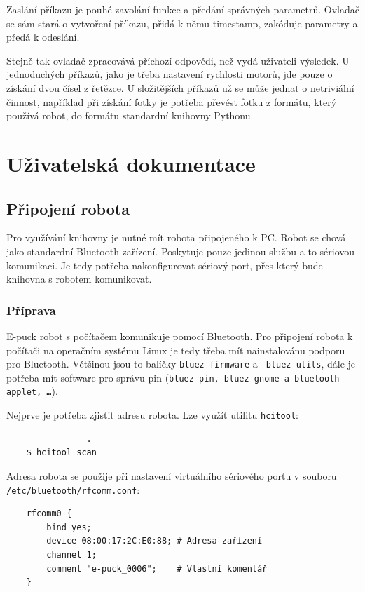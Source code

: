 \documentclass[12pt,notitlepage]{report}
\begin{document}
    Zaslání příkazu je pouhé zavolání funkce a předání správných parametrů.
    Ovladač se sám stará o vytvoření příkazu, přidá k němu timestamp, zakóduje
    parametry a předá k odeslání.

    Stejně tak ovladač zpracovává příchozí odpovědi, než vydá uživateli
    výsledek. U jednoduchých příkazů, jako je třeba nastavení rychlosti motorů,
    jde pouze o získání dvou čísel z řetězce. U složitějších příkazů už se může
    jednat o netriviální činnost, například při získání fotky je potřeba
    převést fotku z formátu, který používá robot, do formátu standardní
    knihovny Pythonu.

\chapter{Uživatelská dokumentace} %

    \section{Připojení robota}
    \label{pripojeni_robota}

    Pro využívání knihovny je nutné mít robota připojeného k PC. Robot se chová
    jako standardní Bluetooth zařízení. Poskytuje pouze jedinou službu a to
    sériovou komunikaci. Je tedy potřeba nakonfigurovat sériový port, přes
    který bude knihovna s robotem komunikovat.

    \subsection{Příprava}

    E-puck robot s počítačem komunikuje pomocí Bluetooth. Pro připojení robota
    k počítači na operačním systému Linux je tedy třeba mít nainstalovánu
    podporu pro Bluetooth. Většinou jsou to balíčky {\tt bluez-firmware} a {\tt
    bluez-utils}, dále je potřeba mít software pro správu pin ({\tt bluez-pin,
    bluez-gnome a bluetooth-applet, \ldots}).

    Nejprve je potřeba zjistit adresu robota. Lze využít utilitu {\tt hcitool}:

    \begin{verbatim}                .
    $ hcitool scan
    \end{verbatim}

    Adresa robota se použije při nastavení virtuálního sériového portu v
    souboru {\tt /etc/bluetooth/rfcomm.conf}:

    \begin{verbatim}
    rfcomm0 {
        bind yes;
        device 08:00:17:2C:E0:88; # Adresa zařízení
        channel 1;
        comment "e-puck_0006";    # Vlastní komentář
    }
    \end{verbatim}
\end{document}

